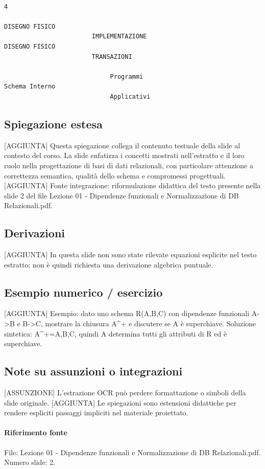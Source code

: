 \documentclass[11pt]{article}
\begin{document}
\begin{lstlisting}
                                                                                                                     4
                                                                                             DISEGNO FISICO
                        IMPLEMENTAZIONE                                                        DISEGNO FISICO
                        TRANSAZIONI

                             Programmi                                                          Schema Interno
                             Applicativi
\end{lstlisting}
\subsection*{Spiegazione estesa}
[AGGIUNTA] Questa spiegazione collega il contenuto testuale della slide al contesto del corso. La slide enfatizza i concetti mostrati nell'estratto e il loro ruolo nella progettazione di basi di dati relazionali, con particolare attenzione a correttezza semantica, qualità dello schema e compromessi progettuali.
[AGGIUNTA] Fonte integrazione: riformulazione didattica del testo presente nella slide 2 del file Lezione 01 - Dipendenze funzionali e Normalizzazione di DB Relazionali.pdf.
\subsection*{Derivazioni}
[AGGIUNTA] In questa slide non sono state rilevate equazioni esplicite nel testo estratto; non è quindi richiesta una derivazione algebrica puntuale.
\subsection*{Esempio numerico / esercizio}
[AGGIUNTA] Esempio: dato uno schema R(A,B,C) con dipendenze funzionali A->B e B->C, mostrare la chiusura A^+ e discutere se A è superchiave. Soluzione sintetica: A^+={A,B,C}, quindi A determina tutti gli attributi di R ed è superchiave.
\subsection*{Note su assunzioni o integrazioni}
[ASSUNZIONE] L'estrazione OCR può perdere formattazione o simboli della slide originale.
[AGGIUNTA] Le spiegazioni sono estensioni didattiche per rendere espliciti passaggi impliciti nel materiale proiettato.
\paragraph{Riferimento fonte} File: Lezione 01 - Dipendenze funzionali e Normalizzazione di DB Relazionali.pdf. Numero slide: 2.
\end{document}
